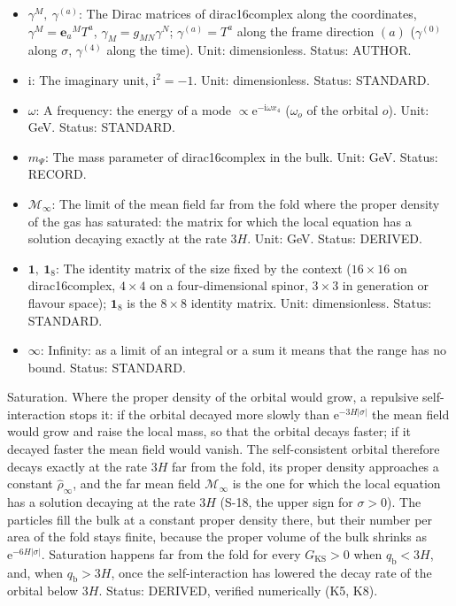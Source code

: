 \documentclass[
  10pt,
]{article}
\begin{document}
\begin{itemize}
  runs over the orbitals or the modes. Status: STANDARD.
\item
  \(\gamma^M,\ \gamma^{(a)}\): The Dirac matrices of dirac16complex
  along the coordinates, \(\gamma^M = \mathbf{e}_a{}^MT^a\),
  \(\gamma_M = g_{MN}\gamma^N\); \(\gamma^{(a)} = T^a\) along the frame
  direction \((a)\) (\(\gamma^{(0)}\) along \(\sigma\), \(\gamma^{(4)}\)
  along the time). Unit: dimensionless. Status: AUTHOR.
\item
  \(\mathrm{i}\): The imaginary unit, \(\mathrm{i}^2 = -1\). Unit:
  dimensionless. Status: STANDARD.
\item
  \(\omega\): A frequency: the energy of a mode
  \(\propto \mathrm{e}^{-\mathrm{i}\omega x_4}\) (\(\omega_o\) of the
  orbital \(o\)). Unit: GeV. Status: STANDARD.
\item
  \(m_\Psi\): The mass parameter of dirac16complex in the bulk. Unit:
  GeV. Status: RECORD.
\item
  \(\mathcal{M}_\infty\): The limit of the mean field far from the fold
  where the proper density of the gas has saturated: the matrix for
  which the local equation has a solution decaying exactly at the rate
  \(3H\). Unit: GeV. Status: DERIVED.
\item
  \(\mathbf{1},\ \mathbf{1}_8\): The identity matrix of the size fixed
  by the context (\(16 \times 16\) on dirac16complex, \(4 \times 4\) on
  a four-dimensional spinor, \(3 \times 3\) in generation or flavour
  space); \(\mathbf{1}_8\) is the \(8 \times 8\) identity matrix. Unit:
  dimensionless. Status: STANDARD.
\item
  \(\infty\): Infinity: as a limit of an integral or a sum it means that
  the range has no bound. Status: STANDARD.
\end{itemize}

Saturation. Where the proper density of the orbital would grow, a
repulsive self-interaction stops it: if the orbital decayed more slowly
than \(\mathrm{e}^{-3H\lvert\sigma\rvert}\) the mean field would grow
and raise the local mass, so that the orbital decays faster; if it
decayed faster the mean field would vanish. The self-consistent orbital
therefore decays exactly at the rate \(3H\) far from the fold, its
proper density approaches a constant \(\hat\rho_\infty\), and the far
mean field \(\mathcal{M}_\infty\) is the one for which the local
equation has a solution decaying at the rate \(3H\) (S-18, the upper
sign for \(\sigma > 0\)). The particles fill the bulk at a constant
proper density there, but their number per area of the fold stays
finite, because the proper volume of the bulk shrinks as
\(\mathrm{e}^{-6H\lvert\sigma\rvert}\). Saturation happens far from the
fold for every \(G_{\mathrm{KS}} > 0\) when \(q_{\mathrm{b}} < 3H\),
and, when \(q_{\mathrm{b}} > 3H\), once the self-interaction has lowered
the decay rate of the orbital below \(3H\). Status: DERIVED, verified
numerically (K5, K8).
\end{document}
